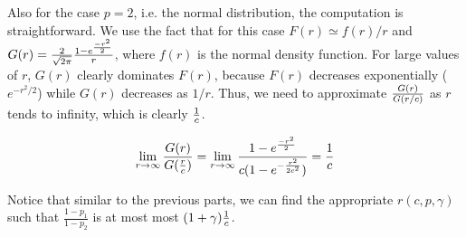 \documentclass[12pt]{article}
\begin{document}
Also for the case $p=2$, i.e. the normal distribution, the computation is
straightforward. We use the fact that for this case $F(r)\simeq f(r)/r$
and $G(r) = {2\over \sqrt{2\pi}}{1-e^{{-{r^2}}\over 2} \over r}$, where
$f(r)$ is the normal density function. For large values of $r$, $G(r)$
clearly dominates $F(r)$, because $F(r)$ decreases exponentially
($e^{-r^2/2}$) while $G(r)$ decreases as $1/r$. Thus, we need to approximate
${G(r)\over G(r/c)}$ as $r$ tends to infinity, which is clearly $1\over c$.

$$\lim_{r\rightarrow \infty}{G(r)\over G({r\over c})} =
\lim_{r\rightarrow \infty} {1-e^{{-{r^2}}\over 2}\over c(1-e^{-{{r^2\over 2c^2}}})} =
{1\over c}$$

Notice that similar to the
previous parts, we can find the appropriate $r(c,p,\gamma)$ such that
$\frac{1-p_1}{1-p_2}$ is at most
most $(1+\gamma){1\over c}$.
\end{document}
